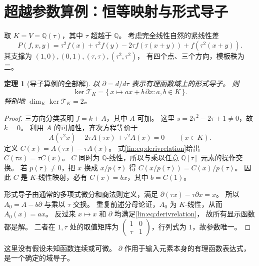 \documentclass[11pt,a4paper,oneside,openany]{book}
\theoremstyle{lecture}
\newtheorem{theorem}{定理}[section]
\newcommand{\Q}{\mathbb Q}
\newcommand{\T}{\mathcal T}
\numberwithin{equation}{section}
\begin{document}
\section{超越参数算例：恒等映射与形式导子}\label{lin:sec:derivexample}
取 $K=V=\Q(\tau)$，其中 $\tau$ 超越于 $\Q$。
考虑完全线性自然的紧线性差
\begin{equation}\label{lin:eq:derivoperator}
 P(f,x,y)=
 \tau^2f(x)+\tau^2f(y)
 -2\tau f(\tau(x+y))+f(\tau^2(x+y)).
\end{equation}
其支撑为 $(1,0),(0,1),(\tau,\tau),(\tau^2,\tau^2)$，
有四个点、三个方向，模板秩为二。

\begin{theorem}[导子算例的全部解]\label{lin:thm:derivkernel}
以 $\partial=d/d\tau$ 表示有理函数域上的形式导子。
则
\[
 \ker\T_K=\{\,x\mapsto ax+b\,\partial x:a,b\in K\,\}.
\]
特别地 $\dim_K\ker\T_K=2$。
\end{theorem}
\begin{proof}
三方向分类表明 $f=k+A$，其中 $A$ 可加。
这里
$s=2\tau^2-2\tau+1\ne0$，故 $k=0$。
利用 $A$ 的可加性，齐次方程等价于
\begin{equation}\label{lin:eq:derivrelation}
 A(\tau^2x)-2\tau A(\tau x)+\tau^2A(x)=0
 \qquad(x\in K).
\end{equation}
定义 $C(x)=A(\tau x)-\tau A(x)$。
式\eqref{lin:eq:derivrelation}给出 $C(\tau x)=\tau C(x)$。
$C$ 同时为 $\Q$-线性，所以与乘以任意 $\Q[\tau]$ 元素的操作交换。
若 $p(\tau)\ne0$，把 $x$ 换成 $x/p(\tau)$ 得
$C(x/p(\tau))=C(x)/p(\tau)$。
因此 $C$ 是 $K$-线性映射，必有 $C(x)=bx$，其中 $b=C(1)$。

形式导子由通常的多项式微分和商法则定义，满足
$\partial(\tau x)-\tau\partial x=x$。
所以 $A_0=A-b\partial$ 与乘以 $\tau$ 交换。
重复前述分母论证，$A_0$ 为 $K$-线性，从而 $A_0(x)=ax$。
反过来 $x\mapsto x$ 和 $\partial$ 均满足\eqref{lin:eq:derivrelation}，
故所有显示函数都是解。
二者在 $1,\tau$ 处的取值矩阵为
$\begin{pmatrix}1&0\\ \tau&1\end{pmatrix}$，行列式为 $1$，故参数唯一。
\end{proof}

这里没有假设未知函数连续或可微。
$\partial$ 作用于输入元素本身的有理函数表达式，是一个确定的域导子。
\end{document}
